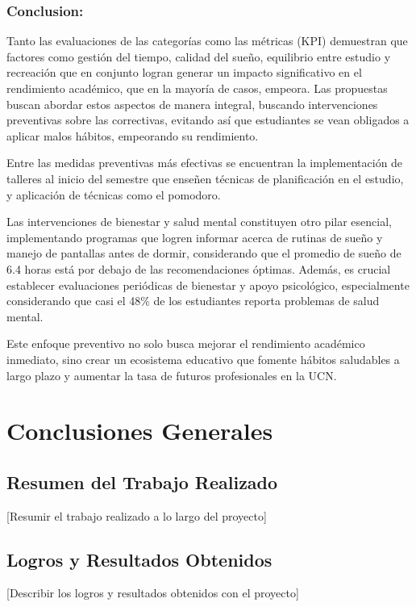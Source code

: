 \documentclass[12pt,letterpaper]{report}
\begin{document}
\subsection{Conclusion:} 
Tanto las evaluaciones de las categorías como las métricas (KPI) demuestran que factores como gestión del tiempo, calidad del sueño, equilibrio entre estudio y recreación que en conjunto logran generar un impacto significativo en el rendimiento académico, que en la mayoría de casos, empeora. Las propuestas buscan abordar estos aspectos de manera integral, buscando intervenciones preventivas sobre las correctivas, evitando así que estudiantes se vean obligados a aplicar malos hábitos, empeorando su rendimiento.

\space
Entre las medidas preventivas más efectivas se encuentran la implementación de talleres al inicio del semestre que enseñen técnicas de planificación en el estudio, y aplicación de técnicas como el pomodoro.

\space
Las intervenciones de bienestar y salud mental constituyen otro pilar esencial, implementando programas que logren informar acerca de rutinas de sueño y manejo de pantallas antes de dormir, considerando que el promedio de sueño de 6.4 horas está por debajo de las recomendaciones óptimas. Además, es crucial establecer evaluaciones periódicas de bienestar y apoyo psicológico, especialmente considerando que casi el 48\% de los estudiantes reporta problemas de salud mental.

\space
Este enfoque preventivo no solo busca mejorar el rendimiento académico inmediato, sino crear un ecosistema educativo que fomente hábitos saludables a largo plazo y aumentar la tasa de futuros profesionales en la UCN.


\chapter{Conclusiones Generales}

\section{Resumen del Trabajo Realizado}
[Resumir el trabajo realizado a lo largo del proyecto]

\section{Logros y Resultados Obtenidos}
[Describir los logros y resultados obtenidos con el proyecto]
\end{document}
